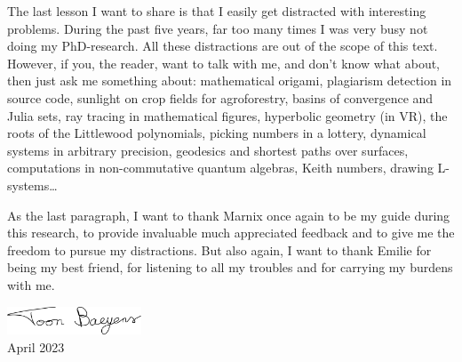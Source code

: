 The last lesson I want to share is that I easily get distracted with interesting problems. During the past five years, far too many times I was very busy not doing my PhD-research. All these distractions are out of the scope of this text. However, if you, the reader, want to talk with me, and don't know what about, then just ask me something about:
mathematical origami,
plagiarism detection in source code,
sunlight on crop fields for agroforestry,
basins of convergence and Julia sets,
ray tracing in mathematical figures,
hyperbolic geometry (in VR),
the roots of the Littlewood polynomials,
picking numbers in a lottery,
dynamical systems in arbitrary precision,
geodesics and shortest paths over surfaces,
computations in non-commutative quantum algebras,
Keith numbers,
drawing L-systems\dots

As the last paragraph, I want to thank Marnix once again to be my guide during this research, to provide invaluable much appreciated feedback and to give me the freedom to pursue my distractions. But also again, I want to thank Emilie for being my best friend, for listening to all my troubles and for carrying my burdens with me.

\vspace{1cm}

\begin{flushright}
    \includegraphics[width=4cm]{img/signature.pdf}\\
    April 2023
\end{flushright}

\stopchapter
